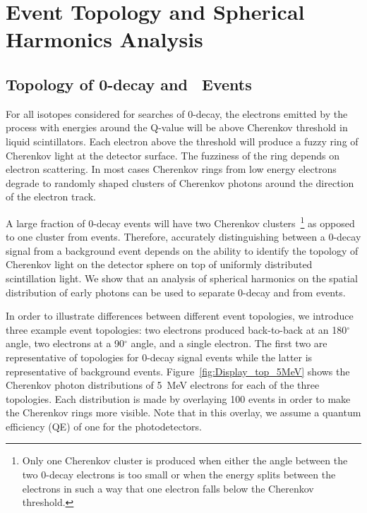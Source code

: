 \section{Event Topology and Spherical Harmonics Analysis}
\label{sec:topology_and_harmonics}

\subsection{Topology of 0\nbb-decay and \B~Events}
\label{subsec:topology}

For all isotopes considered for searches of 0\nbb-decay, the electrons emitted by the process with energies around the Q-value will be above Cherenkov threshold in liquid scintillators.  Each electron above the threshold will produce a fuzzy ring of Cherenkov light at the detector surface. The fuzziness of the ring depends on electron scattering. In most cases Cherenkov rings from low energy electrons degrade to randomly shaped clusters of Cherenkov photons around the direction of the electron track. 

A large fraction of 0\nbb-decay events will have two Cherenkov clusters~\footnote{Only one Cherenkov cluster is produced when either the angle between the two 0\nbb-decay electrons is too small or when the energy splits between the electrons in such a way that one electron falls below the Cherenkov threshold.} as opposed to one cluster from \B events. Therefore, accurately distinguishing between a 0\nbb-decay signal from a \B background event depends on the ability to identify the topology of Cherenkov light on the detector sphere on top of uniformly distributed scintillation light. We show that an analysis of spherical harmonics on the spatial distribution of early photons can be used to separate 0\nbb-decay and from \B events.


In order to illustrate differences between different event topologies, we introduce three example event topologies: two electrons produced back-to-back at an 180$^{\circ}$ angle, two electrons at a 90$^{\circ}$ angle, and a single electron. The first two are representative of topologies for 0\nbb-decay signal events while the latter is representative of \B background events. Figure~\ref{fig:Display_top_5MeV} shows the Cherenkov photon distributions of 5~MeV electrons for each of the three topologies. Each distribution is made by overlaying 100 events in order to make the Cherenkov rings more visible. Note that in this overlay, we assume a quantum efficiency (QE) of one for the photodetectors.


